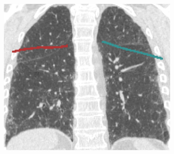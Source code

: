 {\begin{figure}[htbp]
\begin{subfigure}{.32\linewidth}
  \includegraphics[width=\linewidth,trim={{.0\wd0} {.0\wd0} {.0\wd0} {.0\wd0}},clip]{Segmentation/Image/IPF203_PCAGuessing_Coronal364.png}
  \caption{}
  \label{fig:IPFSegmentationResults-h} 
\end{subfigure}
\begin{subfigure}{.32\linewidth}%

\end{subfigure}
\end{figure}}
